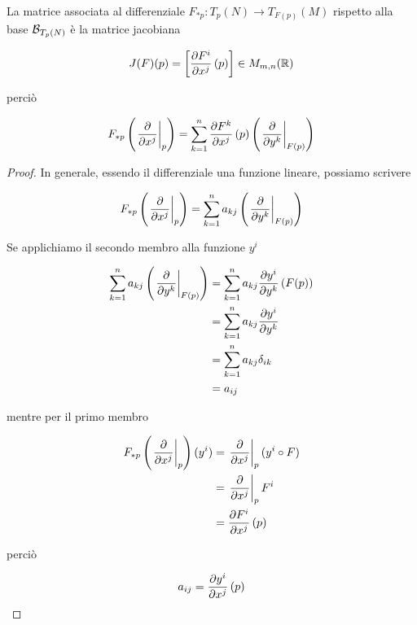 La matrice associata al differenziale $ F_{*p} : T_{p}(N) \to T_{F(p)}(M) $ rispetto alla base $ \mathcal{B}_{T_{p}(N)} $ è la matrice jacobiana

\begin{equation}
	J(F)(p) = \left[ \pdv{F^{i}}{x^{j}} \, (p) \right] \in M_{m,n}(\mathbb{R})
\end{equation}

perciò

\begin{equation}
	F_{*p} \left( \eval{ \pdv{x^{j}} }_{p} \right) = \sum_{k=1}^{n} \pdv{F^{k}}{x^{j}} \, (p) \left( \eval{ \pdv{y^{k}} }_{F(p)} \right)
\end{equation}

\begin{proof}
	In generale, essendo il differenziale una funzione lineare, possiamo scrivere
	
	\begin{equation}
		F_{*p} \left( \eval{ \pdv{x^{j}} }_{p} \right) = \sum_{k=1}^{n} a_{kj} \left( \eval{ \pdv{y^{k}} }_{F(p)} \right)
	\end{equation}
	
	Se applichiamo il secondo membro alla funzione $ y^{i} $
	
	\begin{align}
		\begin{split}
			\sum_{k=1}^{n} a_{kj} \left( \eval{ \pdv{y^{k}} }_{F(p)} \right) &= \sum_{k=1}^{n} a_{kj} \pdv{y^{i}}{y^{k}} \, (F(p))\\
			&= \sum_{k=1}^{n} a_{kj} \pdv{y^{i}}{y^{k}}\\
			&= \sum_{k=1}^{n} a_{kj} \delta_{ik}\\
			&= a_{ij}
		\end{split}
	\end{align}
	
	mentre per il primo membro
	
	\begin{align}
		\begin{split}
			F_{*p} \left( \eval{ \pdv{x^{j}} }_{p} \right) (y^{i}) &= \eval{ \pdv{x^{j}} }_{p} (y^{i} \circ F)\\
			&= \eval{ \pdv{x^{j}} }_{p} F^{i}\\
			&= \pdv{F^{i}}{x^{j}} \, (p)
		\end{split}
	\end{align}

	perciò
	
	\begin{equation}
	a_{ij} = \pdv{y^{i}}{x^{j}} \, (p)
	\end{equation}
\end{proof}

